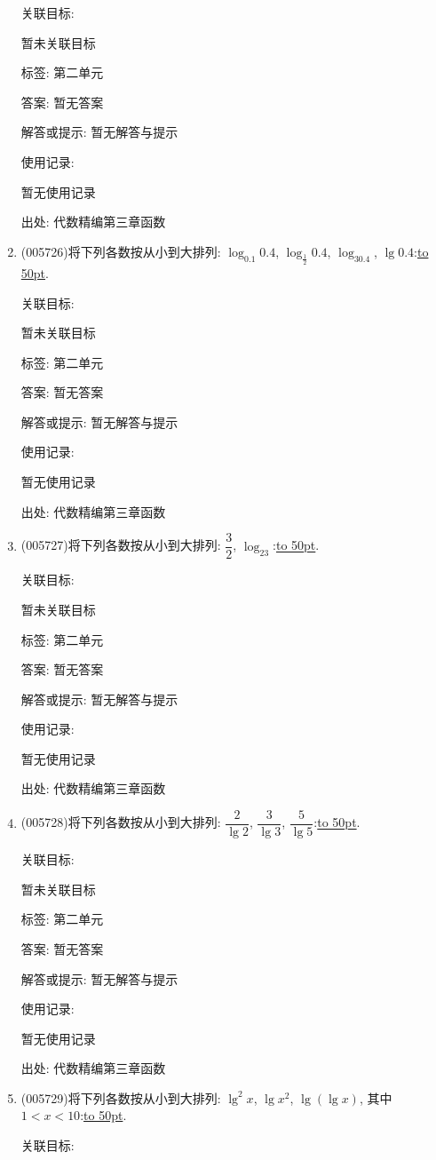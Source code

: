 \documentclass[10pt,a4paper]{article}
\newcommand{\blank}[1]{\underline{\hbox to #1pt{}}}
\begin{document}
\begin{enumerate}[1.]
关联目标:

暂未关联目标



标签: 第二单元

答案: 暂无答案

解答或提示: 暂无解答与提示

使用记录:

暂无使用记录


出处: 代数精编第三章函数
\item { (005726)}将下列各数按从小到大排列: $\log_{0.1}0.4$, $\log_{\frac 12}0.4$, $\log_30.4$, $\lg 0.4$:\blank{50}.


关联目标:

暂未关联目标



标签: 第二单元

答案: 暂无答案

解答或提示: 暂无解答与提示

使用记录:

暂无使用记录


出处: 代数精编第三章函数
\item { (005727)}将下列各数按从小到大排列: $\dfrac 32$, $\log_23$:\blank{50}.


关联目标:

暂未关联目标



标签: 第二单元

答案: 暂无答案

解答或提示: 暂无解答与提示

使用记录:

暂无使用记录


出处: 代数精编第三章函数
\item { (005728)}将下列各数按从小到大排列: $\dfrac 2{\lg 2}$, $\dfrac 3{\lg 3}$, $\dfrac 5{\lg 5}$:\blank{50}.


关联目标:

暂未关联目标



标签: 第二单元

答案: 暂无答案

解答或提示: 暂无解答与提示

使用记录:

暂无使用记录


出处: 代数精编第三章函数
\item { (005729)}将下列各数按从小到大排列: $\lg ^2x$, $\lg x^2$, $\lg (\lg x)$, 其中$1<x<10$:\blank{50}.


关联目标:


\end{enumerate}
\end{document}
